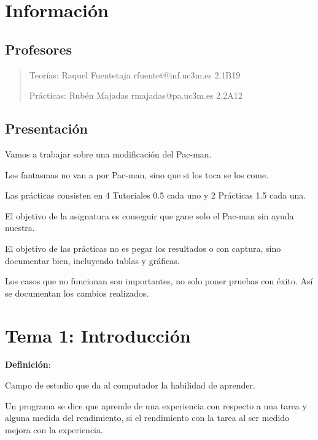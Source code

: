 \documentclass[12pt, twoside, openright]{report} %
\begin{document}
\listoffigures
\thispagestyle{fancy}



\chapter{Información}
\section{Profesores}

\begin{quote}
Teorías: Raquel Fuentetaja rfuentet@inf.uc3m.es 2.1B19

Prácticas: Rubén Majadas rmajadas@pa.uc3m.es 2.2A12
\end{quote}

\section{Presentación}

Vamos a trabajar sobre una modificación del Pac-man.

Los fantasmas no van a por Pac-man, sino que si los toca se los come.

Las prácticas consisten en 4 Tutoriales 0.5 cada uno y 2 Prácticas 1.5 cada una.

El objetivo de la asignatura es conseguir que gane solo el Pac-man sin ayuda nuestra.

El objetivo de las prácticas no es pegar los resultados o con captura, sino documentar bien, incluyendo tablas y gráficas.

Los casos que no funcionan son importantes, no solo poner pruebas con éxito. Así se documentan los cambios realizados.


\chapter{Tema 1: Introducción}

\textbf{Definición}:

Campo de estudio que da al computador la habilidad de aprender.

Un programa se dice que aprende de una experiencia con respecto a una tarea y alguna medida del rendimiento, si el rendimiento con la tarea al ser medido mejora con la experiencia.
\end{document}
